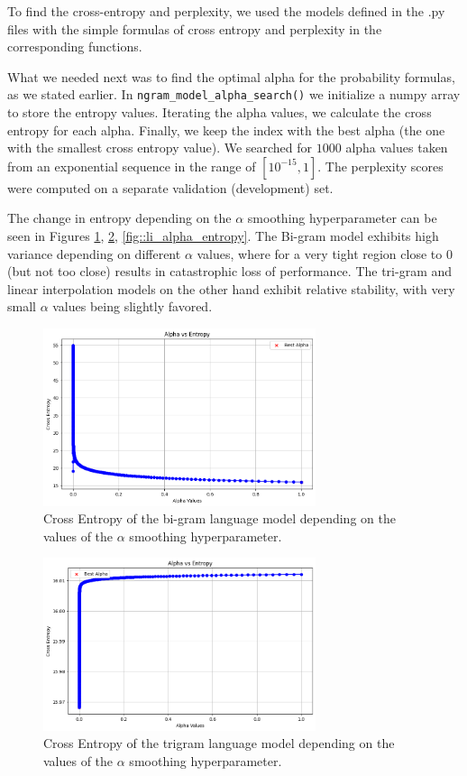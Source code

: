 \documentclass[11pt, a4paper]{article}
\begin{document}
	To find the cross-entropy and perplexity, we used the models defined in the .py files with the simple formulas of cross entropy and perplexity in the corresponding functions. 
	
	What we needed next was to find the optimal alpha for the probability formulas, as we stated earlier. In \texttt{ngram\_model\_alpha\_search()} we initialize a numpy array to store the entropy values. Iterating the alpha values, we calculate the cross entropy for each alpha. Finally, we keep the index with the best alpha (the one with the smallest cross entropy value). We searched for $1000$ alpha values taken from an exponential sequence in the range of $[10^{-15}, 1]$. The perplexity scores were computed on a separate validation (development) set.
	
	The change in entropy depending on the $\alpha$ smoothing hyperparameter can be seen in Figures \ref{fig::bi_alpha_entropy}, \ref{fig::tri_alpha_entropy}, \ref{fig::li_alpha_entropy}. The Bi-gram model exhibits high variance depending on different $\alpha$ values, where for a very tight region close to 0 (but not too close) results in catastrophic loss of performance. The tri-gram and linear interpolation models on the other hand exhibit relative stability, with very small $\alpha$ values being slightly favored.
	
	
	 \begin{figure}
	    \centering
	    \includegraphics[width=8cm]{"bi_alpha.png"}
	    \caption{Cross Entropy of the bi-gram language model depending on the values of the $\alpha$ smoothing hyperparameter.}
	    \label{fig::bi_alpha_entropy}
	\end{figure}

	\begin{figure}
		\centering
		\includegraphics[width=8cm]{"tri_alpha.png"}
		\caption{Cross Entropy of the trigram language model depending on the values of the $\alpha$ smoothing hyperparameter.}
		\label{fig::tri_alpha_entropy}
	\end{figure}
	
\end{document}
